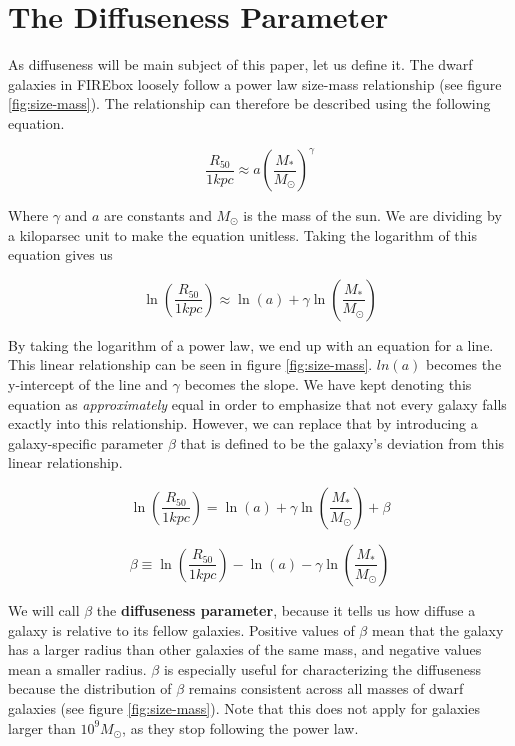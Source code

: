 \section{The Diffuseness Parameter}
As diffuseness will be main subject of this paper, let us define it. The dwarf galaxies in FIREbox loosely follow a power law size-mass relationship (see figure \ref{fig:size-mass}). The relationship can therefore be described using the following equation.

\begin{equation}
    \frac{R_{50}}{1 kpc} \approx a
    \left(
        \frac{M_*}{M_\odot}
    \right)
    ^{\gamma}
\end{equation}

Where $\gamma$ and $a$ are constants and $M_\odot$ is the mass of the sun. We are dividing by a kiloparsec unit to make the equation unitless. Taking the logarithm of this equation gives us

\begin{equation}
    \ln \left(
        \frac{R_{50}}{1 kpc}
    \right)
    \approx
    \ln(a)
    + \gamma \ln \left(
        \frac{M_*}{M_\odot}
    \right)
\end{equation} \label{equ:linear-rel}

By taking the logarithm of a power law, we end up with an equation for a line. This linear relationship can be seen in figure \ref{fig:size-mass}. $ln(a)$ becomes the y-intercept of the line and $\gamma$ becomes the slope. We have kept denoting this equation as \emph{approximately} equal in order to emphasize that not every galaxy falls exactly into this relationship. However, we can replace that by introducing a galaxy-specific parameter $\beta$ that is defined to be the galaxy's deviation from this linear relationship.

\begin{equation}
    \ln \left(
        \frac{R_{50}}{1 kpc}
    \right)
    =
    \ln(a)
    + \gamma \ln \left(
        \frac{M_*}{M_\odot}
    \right)
    + \beta
\end{equation}

\begin{equation}
    \beta
    \equiv
    \ln \left(
        \frac{R_{50}}{1 kpc}
    \right)
    -
    \ln(a)
    - \gamma \ln \left(
        \frac{M_*}{M_\odot}
    \right)
\end{equation} \label{equ:beta}

We will call $\beta$ the \textbf{diffuseness parameter}, because it tells us how diffuse a galaxy is relative to its fellow galaxies. Positive values of $\beta$ mean that the galaxy has a larger radius than other galaxies of the same mass, and negative values mean a smaller radius. $\beta$ is especially useful for characterizing the diffuseness because the distribution of $\beta$ remains consistent across all masses of dwarf galaxies (see figure \ref{fig:size-mass}). Note that this does not apply for galaxies larger than $10^9 M_\odot$, as they stop following the power law.

